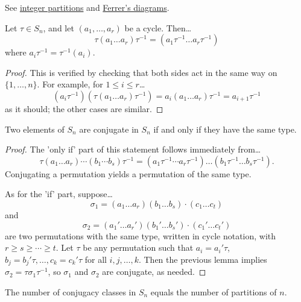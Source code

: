 See \hyperref[integerpartitions]{integer partitions} and \hyperref[ferrers]{Ferrer's diagrams}.

\begin{lemma}
Let $\tau \in S_n$, and let $(a_1, \dots, a_r)$ be a cycle. Then\dots
$$\tau(a_1 \dots a_r) \tau^{-1} = (a_1 \tau^{-1} \dots a_r \tau^{-1})$$
where $a_i\tau^{-1} = \tau^{-1}(a_i)$.
\end{lemma}

\begin{proof}
This is verified by checking that both sides act in the same way on $\{ 1, \dots, n \}$. For example, for $1 \leq i \leq r$\dots
$$(a_i\tau^{-1})(\tau(a_1 \dots a_r)\tau^{-1}) = a_i(a_1 \dots a_r) \tau^{-1} = a_{i+1} \tau^{-1}$$
as it should; the other cases are similar.
\end{proof}

\begin{proposition}
Two elements of $S_n$ are conjugate in $S_n$ if and only if they have the same type.
\end{proposition}

\begin{proof}
The 'only if' part of this statement follows immediately from\dots
$$\tau (a_1 \dots a_r) \cdots (b_1 \cdots b_s) \tau^{-1} = (a_1\tau^{-1} \cdots a_r \tau^{-1}) \dots (b_1 \tau^{-1} \dots b_s\tau^{-1}).$$
Conjugating a permutation yields a permutation of the same type.

As for the 'if' part, suppose\dots
$$\sigma_1 = (a_1 \dots a_r)(b_1 \dots b_s)\cdot (c_1 \dots c_t)$$
and
$$\sigma_2 = (a_1'\dots a_r')(b_1' \dots b_s')\cdot (c_1'\dots c_t')$$
are two permutations with the same type, written in cycle notation, with $r \geq s \geq \cdots \geq t$. Let $\tau$ be any permutation such that $a_i = a_i'\tau$, $b_j = b_j'\tau, \dots, c_k = c_k' \tau$
for all $i, j, \dots, k$. Then the previous lemma implies $\sigma_2 = \tau \sigma_1 \tau^{-1}$, so $\sigma_1$ and $\sigma_2$ are conjugate, as needed.
\end{proof}

\begin{corollary}
The number of conjugacy classes in $S_n$ equals the number of partitions of $n$.
\end{corollary}
